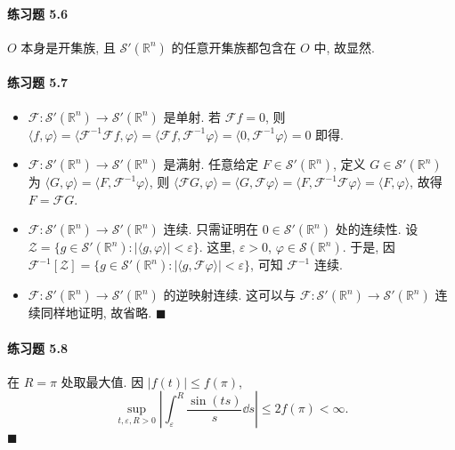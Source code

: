 \paragraph*{练习题 5.6}
$O$ 本身是开集族, 且 $\mathcal{S}'(\mathbb{R}^{n})$ 的任意开集族都包含在 $O$ 中, 故显然.

\paragraph*{练习题 5.7}
\begin{itemize}
\item $\mathcal{F}: \mathcal{S}'(\mathbb{R}^{n}) \to \mathcal{S}'(\mathbb{R}^{n})$ 是单射. 若 $\mathcal{F}f = 0$, 则 $\langle f, \varphi\rangle = \langle \mathcal{F}^{-1}\mathcal{F}f, \varphi\rangle = \langle \mathcal{F}f, \mathcal{F}^{-1}\varphi\rangle = \langle 0, \mathcal{F}^{-1}\varphi\rangle = 0$ 即得.

\item $\mathcal{F}: \mathcal{S}'(\mathbb{R}^{n}) \to \mathcal{S}'(\mathbb{R}^{n})$ 是满射. 任意给定 $F \in \mathcal{S}'(\mathbb{R}^{n})$, 定义 $G \in \mathcal{S}'(\mathbb{R}^{n})$ 为 $\langle G, \varphi\rangle = \langle F, \mathcal{F}^{-1}\varphi\rangle$, 则 $\langle \mathcal{F}G, \varphi\rangle = \langle G, \mathcal{F}\varphi\rangle = \langle F, \mathcal{F}^{-1}\mathcal{F}\varphi\rangle = \langle F, \varphi\rangle$, 故得 $F = \mathcal{F}G$.

\item $\mathcal{F}: \mathcal{S}'(\mathbb{R}^{n}) \to \mathcal{S}'(\mathbb{R}^{n})$ 连续. 只需证明在 $0 \in \mathcal{S}'(\mathbb{R}^{n})$ 处的连续性. 设 $\mathcal{Z} = \{g \in \mathcal{S}'(\mathbb{R}^{n}) : |\langle g, \varphi\rangle| < \varepsilon\}$. 这里, $\varepsilon > 0$, $\varphi \in \mathcal{S}(\mathbb{R}^{n})$. 于是, 因 $\mathcal{F}^{-1}[\mathcal{Z}] = \{g \in \mathcal{S}'(\mathbb{R}^{n}) : |\langle g, \mathcal{F}\varphi\rangle| < \varepsilon\}$, 可知 $\mathcal{F}^{-1}$ 连续.

\item $\mathcal{F}: \mathcal{S}'(\mathbb{R}^{n}) \to \mathcal{S}'(\mathbb{R}^{n})$ 的逆映射连续. 这可以与 $\mathcal{F}: \mathcal{S}'(\mathbb{R}^{n}) \to \mathcal{S}'(\mathbb{R}^{n})$ 连续同样地证明, 故省略. $\blacksquare$
\end{itemize}

\paragraph*{练习题 5.8}
在 $R = \pi$ 处取最大值. 因 $|f(t)| \leq f(\pi)$,
\[
\sup_{t, \varepsilon, R > 0}\left|\int_{\varepsilon}^{R}\frac{\sin(ts)}{s}\dd s\right| \leq 2f(\pi) < \infty.
\]
$\blacksquare$

